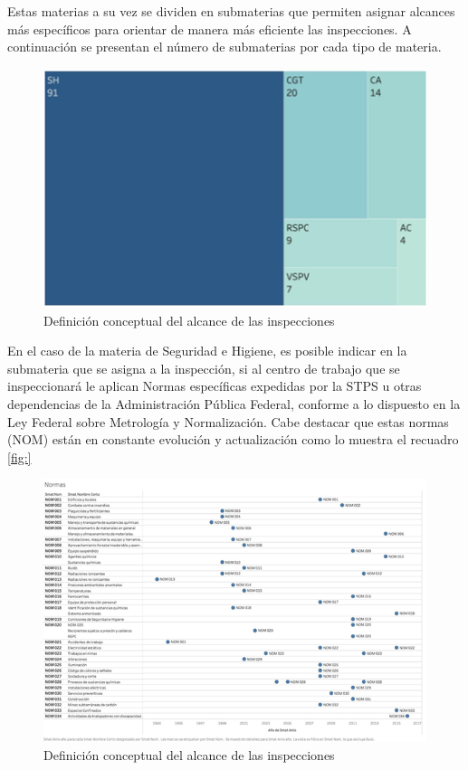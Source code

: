 \documentclass[
]{article}
\begin{document}
Estas materias a su vez se dividen en submaterias que permiten asignar alcances más específicos para orientar de manera más eficiente las inspecciones. A continuación se presentan el número de submaterias por cada tipo de materia.

\begin{figure}
\includegraphics[width=5.75in]{images-1/08/submaterias} \caption{Definición conceptual del alcance de las inspecciones}\label{fig:submaterias}
\end{figure}

En el caso de la materia de Seguridad e Higiene, es posible indicar en la submateria que se asigna a la inspección, si al centro de trabajo que se inspeccionará le aplican Normas específicas expedidas por la STPS u otras dependencias de la Administración Pública Federal, conforme a lo dispuesto en la Ley Federal sobre Metrología y Normalización. Cabe destacar que estas normas (NOM) están en constante evolución y actualización como lo muestra el recuadro \ref{fig:}

\begin{figure}
\includegraphics[width=8.17in]{images-1/08/submateriasSH} \caption{Definición conceptual del alcance de las inspecciones}\label{fig:submateriasSH}
\end{figure}
\end{document}
